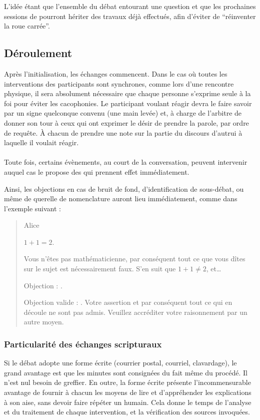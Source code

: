 L’idée étant que l’ensemble du débat entourant une question et que les prochaines sessions de \mainabbr{} pourront hériter des travaux déjà effectués, afin d’éviter de \enquote{réinventer la roue carrée}.
\subsection{Déroulement}
Après l’initialisation, les échanges commencent. Dans le cas où toutes les interventions des participants sont synchrones, comme lors d’une rencontre physique, il sera absolument nécessaire que chaque personne s’exprime seule à la foi pour éviter les cacophonies. Le participant voulant réagir devra le faire savoir par un signe quelconque convenu (une main levée) et, à charge de l’arbitre de donner son tour à ceux qui ont exprimer le désir de prendre la parole, par ordre de requête. À chacun de prendre une note sur la partie du discours d’autrui à laquelle il voulait réagir.

\paragraph{}
Toute fois, certains évènements, au court de la conversation, peuvent intervenir auquel cas le \mainabbr{} propose des  qui prennent effet immédiatement.

Ainsi, les objections en cas de bruit de fond, d’identification de sous-débat, ou même de querelle de nomenclature auront lieu immédiatement, comme dans l’exemple suivant :
\begin{quote}
  \begin{drama}{0cm}{0cm}{Alice}

    \Aspeaks       $1+1=2$.

    \Bspeaks       Vous n’êtes pas mathématicienne, par conséquent tout ce que vous dîtes sur le sujet est nécessairement faux. S’en suit que $1+1\neq2$, et…

    \Aspeaks       Objection : .

    \Arbitrespeaks Objection valide : \B. Votre assertion et par conséquent tout ce qui en découle ne sont pas admis. Veuillez accréditer votre raisonnement par un autre moyen.

  \end{drama}
\end{quote}

\subsubsection{Particularité des échanges scripturaux}
Si le débat adopte une forme écrite (courrier postal, courriel, clavardage), le grand avantage est que les minutes sont consignées du fait même du procédé. Il n’est nul besoin de greffier. En outre, la forme écrite présente l’incommensurable avantage de fournir à chacun les moyens de lire et d’appréhender les explications à son aise, sans devoir faire répéter un humain. Cela donne le temps de l’analyse et du traitement de chaque intervention, et la vérification des sources invoquées.

